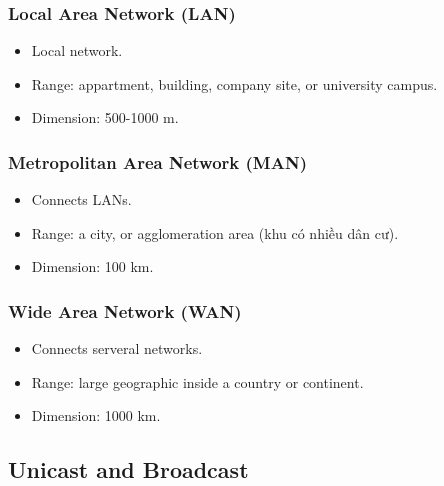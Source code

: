 \subsubsection{Local Area Network (LAN)}

\begin{itemize}
  \item Local network.
  \item Range: appartment, building, company site, or university campus.
  \item Dimension: 500-1000 m.
\end{itemize}

\subsubsection{Metropolitan Area Network (MAN)}

\begin{itemize}
  \item Connects LANs.
  \item Range: a city, or agglomeration area (khu có nhiều dân cư).
  \item Dimension: 100 km.
\end{itemize}

\subsubsection{Wide Area Network (WAN)}

\begin{itemize}
  \item Connects serveral networks.
  \item Range: large geographic inside a country or continent.
  \item Dimension: 1000 km.
\end{itemize}



\subsection{Unicast and Broadcast}

